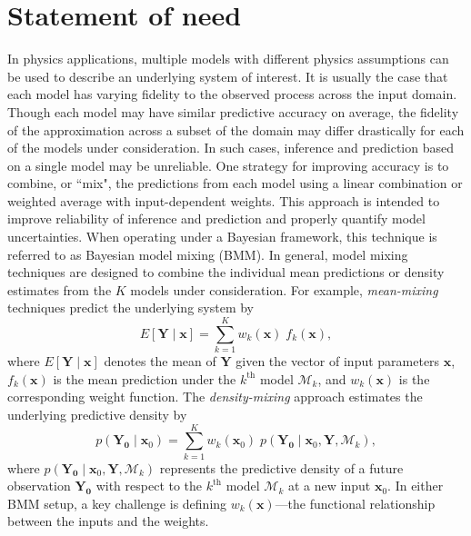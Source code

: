 \documentclass[10pt, preprint,aps,prc,floatfix,
tightenlines,
nofootinbib,superscriptaddress]{revtex4-2}
\newcommand{\M}{\mathcal{M}}
\newcommand{\xvec}{\boldsymbol x}
\begin{document}
\section{Statement of need}

In physics applications, multiple models with different physics assumptions can be used to describe an underlying system of interest. It is usually the case that each model has varying fidelity to the observed process across the input domain. Though each model may have similar predictive accuracy on average, the fidelity of the approximation across a subset of the domain may differ drastically for each of the models under consideration. In such cases, inference and prediction based on a single model may be unreliable. One strategy for improving accuracy is to combine, or  ``mix", the predictions from each model using a linear combination or weighted average with input-dependent weights. This approach is intended to improve reliability of inference and prediction and properly quantify model uncertainties. When operating under a Bayesian framework, this technique is referred to as Bayesian model mixing (BMM). In general, model mixing techniques are designed to combine the individual mean predictions or density estimates from the $K$ models under consideration.
For example, \textit{mean-mixing} techniques predict the underlying system by 
\begin{equation}
    E[\bm Y \mid \xvec] = \sum_{k = 1}^K w_k(\xvec)\; f_k(\xvec),
\end{equation}
where $E[\bm Y\mid\xvec]$ denotes the mean of $\bm Y$ given the vector of input parameters $\bm x$, $f_k(\xvec)$ is the mean prediction under the $k^\mathrm{th}$ model $\mathcal{M}_k$, and $w_k(\xvec)$ is the corresponding weight function. The \textit{density-mixing} approach estimates the underlying predictive density by
\begin{equation}
    p(\bm{Y_{0}} \mid \xvec_{0}) = \sum_{k = 1}^K w_k(\xvec_{0})\;p(\bm{Y_{0}} \mid \xvec_{0}, \bm{Y}, \M_k),
\end{equation}
where $p(\bm{Y_{0}} \mid \xvec_{0}, \bm{Y}, \M_k)$ represents the predictive density of a future observation $\bm{Y_{0}}$ with respect to the $k^\mathrm{th}$ model $\mathcal{M}_k$ at a new input $\xvec_{0}$. In either BMM setup, a key challenge is defining $w_k(\xvec)$---the functional relationship between the inputs and the weights. 
\end{document}
